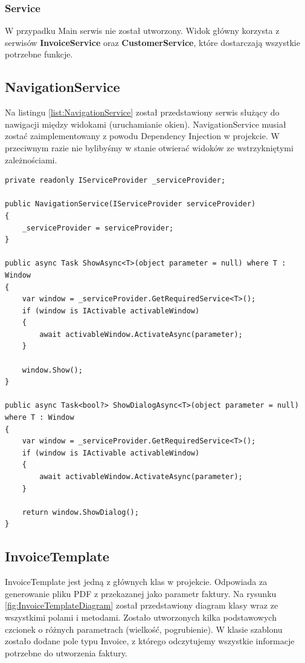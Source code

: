 \subsubsection{Service}

W przypadku Main serwis nie został utworzony. Widok główny korzysta z serwisów \textbf{InvoiceService} oraz \textbf{CustomerService}, które dostarczają wszystkie potrzebne funkcje.

\subsection{NavigationService}
Na listingu \ref{list:NavigationService} został przedstawiony serwis służący do nawigacji między widokami (uruchamianie okien). NavigationService musiał zostać zaimplementowany z powodu Dependency Injection w projekcie. W przeciwnym razie nie bylibyśmy w stanie otwierać widoków ze wstrzykniętymi zależnościami.

\begin{lstlisting}[language={[Sharp]C},label=list:NavigationService,caption=Serwis do nawigacji między widokami, basicstyle=\footnotesize\ttfamily]
private readonly IServiceProvider _serviceProvider;

public NavigationService(IServiceProvider serviceProvider)
{
    _serviceProvider = serviceProvider;
}

public async Task ShowAsync<T>(object parameter = null) where T : Window
{
    var window = _serviceProvider.GetRequiredService<T>();
    if (window is IActivable activableWindow)
    {
        await activableWindow.ActivateAsync(parameter);
    }

    window.Show();
}

public async Task<bool?> ShowDialogAsync<T>(object parameter = null) where T : Window
{
    var window = _serviceProvider.GetRequiredService<T>();
    if (window is IActivable activableWindow)
    {
        await activableWindow.ActivateAsync(parameter);
    }

    return window.ShowDialog();
}
\end{lstlisting}

\subsection{InvoiceTemplate}
InvoiceTemplate jest jedną z głównych klas w projekcie. Odpowiada za generowanie pliku PDF z przekazanej jako parametr faktury. Na rysunku \ref{fig:InvoiceTemplateDiagram} został przedstawiony diagram klasy wraz ze wszystkimi polami i metodami. Zostało utworzonych kilka podstawowych czcionek o różnych parametrach (wielkość, pogrubienie). W klasie szablonu zostało dodane pole typu Invoice, z którego odczytujemy wszystkie informacje potrzebne do utworzenia faktury. 

